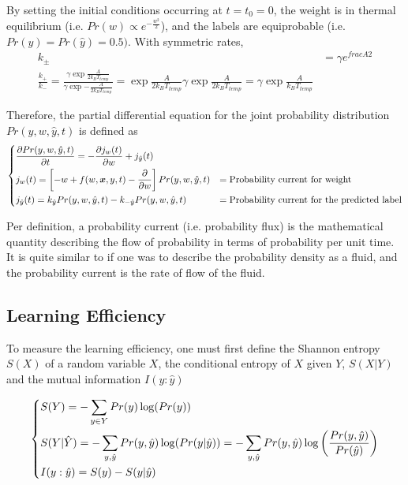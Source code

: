 By setting the initial conditions occurring at $t=t_0 = 0$, the weight is in thermal equilibrium (i.e. $Pr(w) \propto e^{-\frac{w^2}{2}}$), and the labels are equiprobable (i.e. $Pr(y) = Pr(\hat{y}) = 0.5)$. With symmetric rates,
\begin{align*}
    k_\pm &= \gamma e^{frac{A}{2}} \\
    \frac{k_+}{k_-} = \frac{\gamma \exp{\frac{A}{2k_B T_{temp}}}  }{\gamma \exp{-\frac{A}{2k_B T_{temp}}} } = \exp{\frac{A}{2k_B T_{temp}}} \gamma \exp{\frac{A}{2k_B T_{temp}}} = \gamma \exp{\frac{A}{k_B T_{temp}}}
\end{align*}

Therefore, the partial differential equation for the joint probability distribution $Pr(y,w,\hat{y},t)$ is defined as
\begin{equation*}
\begin{dcases}
    \frac{\partial Pr(y,w,\hat{y},t)}{\partial t} = - \frac{\partial j_w (t)}{\partial w} + j_{\hat{y}}(t) \\
    j_w(t) = \left[ -w + f(w,\bm{x},y,t) - \frac{\partial}{\partial w}\right] Pr(y,w,\hat{y}, t) & = \text{Probability current for weight}\\
    j_{\hat{y}}(t) = k_{\hat{y}} Pr(y,w,\hat{y},t) - k_{-\hat{y}} Pr(y,w,\hat{y},t) & = \text{Probability current for the predicted label}
\end{dcases}
\end{equation*}

Per definition, a probability current (i.e. probability flux) is the mathematical quantity describing the flow of probability in terms of probability per unit time. It is quite similar to if one was to describe the probability density as a fluid, and the probability current is the rate of flow of the fluid.

\subsection{Learning Efficiency}
To measure the learning efficiency, one must first define the Shannon entropy $S(X)$ of a random variable $X$, the conditional entropy of $X$ given $Y$, $S(X|Y)$ and the mutual information $I(y:\hat{y})$

\begin{equation*}
\begin{dcases}
    S(Y) = -\sum_{y \in Y} Pr(y) \log(Pr(y)) \\
    S(Y|\hat{Y}) = - \sum_{y,\hat{y}} Pr(y,\hat{y}) \log(Pr(y|\hat{y})) = - \sum_{y,\hat{y}} Pr(y,\hat{y}) \log \left( \frac{Pr(y,\hat{y})}{Pr(\hat{y})}\right) \\
    I(y:\hat{y}) = S(y) - S(y|\hat{y})
\end{dcases}
\end{equation*}

